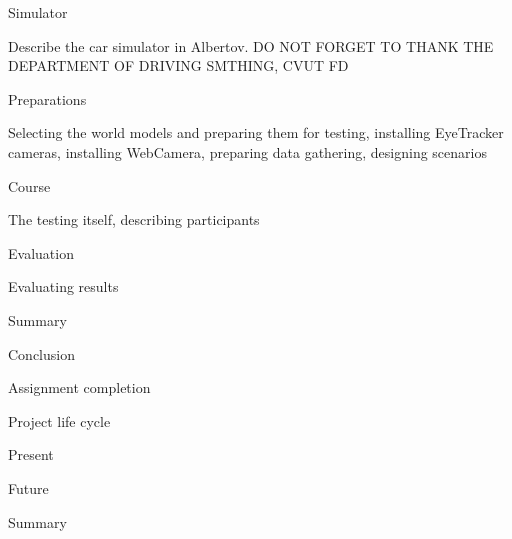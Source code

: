 \seccc Simulator

Describe the car simulator in Albertov.
DO NOT FORGET TO THANK THE DEPARTMENT OF DRIVING SMTHING, CVUT FD


\seccc Preparations

Selecting the world models and preparing them for testing, installing EyeTracker cameras, installing WebCamera, preparing data gathering, designing scenarios

\seccc Course

The testing itself, describing participants

\seccc Evaluation

Evaluating results

\sec Summary


\chap Conclusion


\sec Assignment completion


\sec Project life cycle


\secc Present


\secc Future


\sec Summary



\bye
